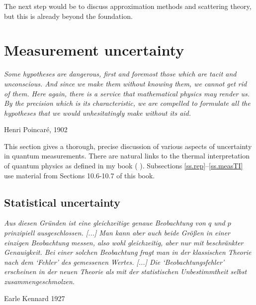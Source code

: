 \documentclass[12pt]{article}
\begin{document}
The next step would be to discuss approximation methods and scattering
theory, but this is already beyond the foundation.











\section{Measurement uncertainty}\label{s.unc}

\nopagebreak
\hfill\parbox[t]{10.8cm}{\footnotesize

{\em Some hypotheses are dangerous, first and foremost those which are
tacit and unconscious. And since we make them without knowing them, we
cannot get rid of them. Here again, there is a service that mathematical
physics may render us. By the precision which is its characteristic, we
are compelled to formulate all the hypotheses that we would
unhesitatingly make without its aid.}

\hfill Henri Poincar\'e, 1902 \cite[p.151]{PoiScH}
}

\bigskip

This section gives a thorough, precise discussion of various aspects of 
uncertainty in quantum measurements. There are natural links to the 
thermal interpretation of quantum physics as defined in my book
( \cite{Neu.CQP}).
Subsections \ref{ss.rep}--\ref{ss.measTI} use material from Sections 
10.6-10.7 of this book.




\subsection{Statistical uncertainty}\label{ss.unc}

\nopagebreak
\hfill\parbox[t]{10.8cm}{\footnotesize

{\em Aus diesen Gr\"unden ist eine gleichzeitige genaue Beobachtung
von $q$ und $p$ prinzipiell ausgeschlossen. [...]
Man kann aber auch beide Gr\"o{\ss}en in einer einzigen Beobachtung
messen, also wohl gleichzeitig, aber nur mit beschr\"ankter Genauigkeit.
Bei einer solchen Beobachtung fragt man in der klassischen Theorie nach
dem `Fehler' des gemessenen Wertes. [...]
Die `Beobachtungsfehler' erscheinen in der neuen Theorie als
mit der statistischen Unbestimmtheit selbst zusammengeschmolzen.}

\hfill Earle Kennard 1927 \cite[p.340f]{Ken}
}
\end{document}
